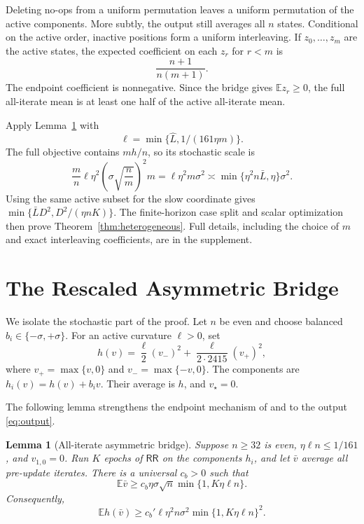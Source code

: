 \documentclass[twoside]{article}
\newtheorem{lemma}[theorem]{Lemma}
\newcommand{\E}{\mathbb E}
\newcommand{\RR}{\mathsf{RR}}
\begin{document}
Deleting no-ops from a uniform permutation leaves a uniform permutation of the active components. More subtly, the output still averages all $n$ states. Conditional on the active order, inactive positions form a uniform interleaving. If $z_0,\ldots,z_m$ are the active states, the expected coefficient on each $z_r$ for $r<m$ is \[ \frac{n+1}{n(m+1)}. \] The endpoint coefficient is nonnegative. Since the bridge gives $\E z_r\ge0$, the full all-iterate mean is at least one half of the active all-iterate mean.

Apply Lemma~\ref{lem:bridge} with \[ \ell=\min\{\widehat L,1/(161\eta m)\}. \] The full objective contains $m h/n$, so its stochastic scale is \[ \frac mn\ell\eta^2 \left(\sigma\sqrt{\frac nm}\right)^2m =\ell\eta^2m\sigma^2 \asymp\min\{\eta^2n\bar L,\eta\}\sigma^2. \] Using the same active subset for the slow coordinate gives $\min\{\bar LD^2,D^2/(\eta nK)\}$. The finite-horizon case split and scalar optimization then prove Theorem~\ref{thm:heterogeneous}. Full details, including the choice of $m$ and exact interleaving coefficients, are in the supplement.

\section{The Rescaled Asymmetric Bridge}
\label{sec:bridge}

We isolate the stochastic part of the proof. Let $n$ be even and choose balanced $b_i\in\{-\sigma,+\sigma\}$. For an active curvature $\ell>0$, set
\begin{equation}
 h(v)=\frac{\ell}{2}(v_-)^2
 +\frac{\ell}{2\cdot2415}(v_+)^2,
 \label{eq:h}
\end{equation}
where $v_+=\max\{v,0\}$ and $v_-=\max\{-v,0\}$. The components are $h_i(v)=h(v)+b_iv$. Their average is $h$, and $v_\star=0$.

The following lemma strengthens the endpoint mechanism of \citet{rajput2020closing} and \citet{cha2023tighter} to the output \eqref{eq:output}.

\begin{lemma}[All-iterate asymmetric bridge]
\label{lem:bridge}
Suppose $n\ge32$ is even, $\eta\ell n\le1/161$, and $v_{1,0}=0$. Run $K$ epochs of $\RR$ on the components $h_i$, and let $\bar v$ average all pre-update iterates. There is a universal $c_b>0$ such that
\begin{equation}
 \E\bar v\ge c_b\eta\sigma\sqrt n
 \min\{1,K\eta\ell n\}.
 \label{eq:bridge-mean}
\end{equation}
Consequently,
\begin{equation}
 \E h(\bar v)\ge c_b'
 \ell\eta^2n\sigma^2
 \min\{1,K\eta\ell n\}^2.
 \label{eq:bridge-risk}
\end{equation}
\end{lemma}
\end{document}
